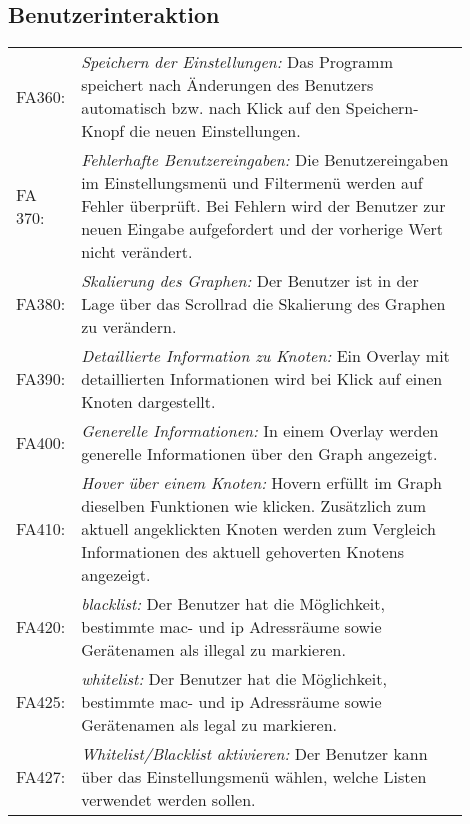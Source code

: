 \subsection{Benutzerinteraktion}

\begin{tabular}{lp{0.9\linewidth}}

FA360: & \textit{Speichern der Einstellungen: }Das Programm speichert nach Änderungen des Benutzers automatisch bzw. nach Klick auf den Speichern-Knopf die neuen Einstellungen. \\

FA 370: & \textit{Fehlerhafte Benutzereingaben: }Die Benutzereingaben im Einstellungsmenü und Filtermenü werden auf Fehler überprüft. Bei Fehlern wird der Benutzer zur neuen Eingabe aufgefordert und der vorherige Wert nicht verändert. \\

FA380: & \textit{Skalierung des Graphen: }Der Benutzer ist in der Lage über das Scrollrad die Skalierung des Graphen zu verändern. \\

FA390: & \textit{Detaillierte Information zu Knoten: }Ein Overlay mit detaillierten Informationen wird bei Klick auf einen Knoten dargestellt. \\

FA400: & \textit{Generelle Informationen: }In einem Overlay werden generelle Informationen über den Graph angezeigt. \\

FA410: & \textit{Hover über einem Knoten: }Hovern erfüllt im Graph dieselben Funktionen wie klicken. Zusätzlich zum aktuell angeklickten Knoten werden zum Vergleich Informationen des aktuell gehoverten Knotens angezeigt. \\

FA420: & \textit{\gls{blacklist}: }Der Benutzer hat die Möglichkeit, bestimmte \gls{mac}- und \gls{ip} Adressräume sowie Gerätenamen als illegal zu markieren. \\

FA425: & \textit{\gls{whitelist}: }Der Benutzer hat die Möglichkeit, bestimmte \gls{mac}- und \gls{ip} Adressräume sowie Gerätenamen als legal zu markieren. \\

FA427: & \textit{Whitelist/Blacklist aktivieren: }Der Benutzer kann über das Einstellungsmenü wählen, welche Listen verwendet werden sollen. \\

\end{tabular}

